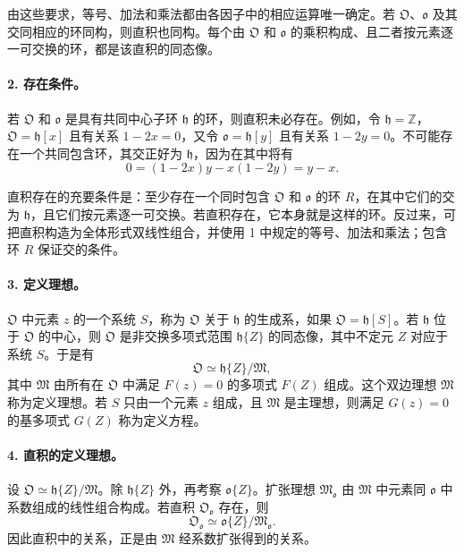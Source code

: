 由这些要求，等号、加法和乘法都由各因子中的相应运算唯一确定。若 \(\mathfrak O\)、\(\mathfrak o\) 及其交同相应的环同构，则直积也同构。每个由 \(\mathfrak O\) 和 \(\mathfrak o\) 的乘积构成、且二者按元素逐一可交换的环，都是该直积的同态像。

\paragraph{2. 存在条件。}
若 \(\mathfrak O\) 和 \(\mathfrak o\) 是具有共同中心子环 \(\mathfrak h\) 的环，则直积未必存在。例如，令 \(\mathfrak h=\mathbb Z\)，\(\mathfrak O=\mathfrak h[x]\) 且有关系 \(1-2x=0\)，又令 \(\mathfrak o=\mathfrak h[y]\) 且有关系 \(1-2y=0\)。不可能存在一个共同包含环，其交正好为 \(\mathfrak h\)，因为在其中将有
\[
        0=(1-2x)y-x(1-2y)=y-x.
\]

直积存在的充要条件是：至少存在一个同时包含 \(\mathfrak O\) 和 \(\mathfrak o\) 的环 \(R\)，在其中它们的交为 \(\mathfrak h\)，且它们按元素逐一可交换。若直积存在，它本身就是这样的环。反过来，可把直积构造为全体形式双线性组合，并使用 1 中规定的等号、加法和乘法；包含环 \(R\) 保证交的条件。

\paragraph{3. 定义理想。}
\(\mathfrak O\) 中元素 \(z\) 的一个系统 \(S\)，称为 \(\mathfrak O\) 关于 \(\mathfrak h\) 的生成系，如果 \(\mathfrak O=\mathfrak h[S]\)。若 \(\mathfrak h\) 位于 \(\mathfrak O\) 的中心，则 \(\mathfrak O\) 是非交换多项式范围 \(\mathfrak h\{Z\}\) 的同态像，其中不定元 \(Z\) 对应于系统 \(S\)。于是有
\[
        \mathfrak O\simeq \mathfrak h\{Z\}/\mathfrak M,
\]
其中 \(\mathfrak M\) 由所有在 \(\mathfrak O\) 中满足 \(F(z)=0\) 的多项式 \(F(Z)\) 组成。这个双边理想 \(\mathfrak M\) 称为定义理想。若 \(S\) 只由一个元素 \(z\) 组成，且 \(\mathfrak M\) 是主理想，则满足 \(G(z)=0\) 的基多项式 \(G(Z)\) 称为定义方程。

\paragraph{4. 直积的定义理想。}
设 \(\mathfrak O\simeq\mathfrak h\{Z\}/\mathfrak M\)。除 \(\mathfrak h\{Z\}\) 外，再考察 \(\mathfrak o\{Z\}\)。扩张理想 \(\mathfrak M_{\mathfrak o}\) 由 \(\mathfrak M\) 中元素同 \(\mathfrak o\) 中系数组成的线性组合构成。若直积 \(\mathfrak O_{\mathfrak o}\) 存在，则
\[
        \mathfrak O_{\mathfrak o}\simeq \mathfrak o\{Z\}/\mathfrak M_{\mathfrak o}.
\]
因此直积中的关系，正是由 \(\mathfrak M\) 经系数扩张得到的关系。

